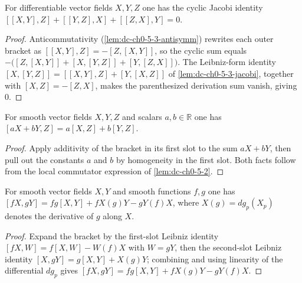 \begin{lemma}
  \label{lem:dc-ch0-5-3-jacobi-cyclic}


  For differentiable vector fields $X,Y,Z$ one has the cyclic Jacobi identity
  $[[X,Y],Z]+[[Y,Z],X]+[[Z,X],Y]=0$.
\end{lemma}
\begin{proof}
  \sketch

  Anticommutativity (\cref{lem:dc-ch0-5-3-antisymm}) rewrites each outer bracket as
  $[[X,Y],Z]=-[Z,[X,Y]]$, so the cyclic sum equals
  $-\big([Z,[X,Y]]+[X,[Y,Z]]+[Y,[Z,X]]\big)$. The Leibniz-form identity
  $[X,[Y,Z]]=[[X,Y],Z]+[Y,[X,Z]]$ of \cref{lem:dc-ch0-5-3-jacobi}, together with
  $[X,Z]=-[Z,X]$, makes the parenthesized derivation sum vanish, giving $0$.
\end{proof}

\begin{lemma}
  \label{lem:dc-ch0-5-3-bilinear}


  For smooth vector fields $X,Y,Z$ and scalars $a,b\in\mathbb{R}$ one has
  $[aX+bY,Z]=a[X,Z]+b[Y,Z]$.
\end{lemma}
\begin{proof}
  \sketch

  Apply additivity of the bracket in its first slot to the sum $aX+bY$, then pull
  out the constants $a$ and $b$ by homogeneity in the first slot. Both facts follow
  from the local commutator expression of \cref{lem:dc-ch0-5-2}.
\end{proof}

\begin{lemma}
  \label{lem:dc-ch0-5-3-leibniz}


  For smooth vector fields $X,Y$ and smooth functions $f,g$ one has
  $[fX,gY]=fg[X,Y]+fX(g)Y-gY(f)X$, where $X(g)=dg_p(X_p)$ denotes the derivative
  of $g$ along $X$.
\end{lemma}
\begin{proof}
  \sketch

  Expand the bracket by the first-slot Leibniz identity
  $[fX,W]=f[X,W]-W(f)X$ with $W=gY$, then the second-slot Leibniz identity
  $[X,gY]=g[X,Y]+X(g)Y$; combining and using linearity of the differential
  $dg_p$ gives $[fX,gY]=fg[X,Y]+fX(g)Y-gY(f)X$.
\end{proof}

